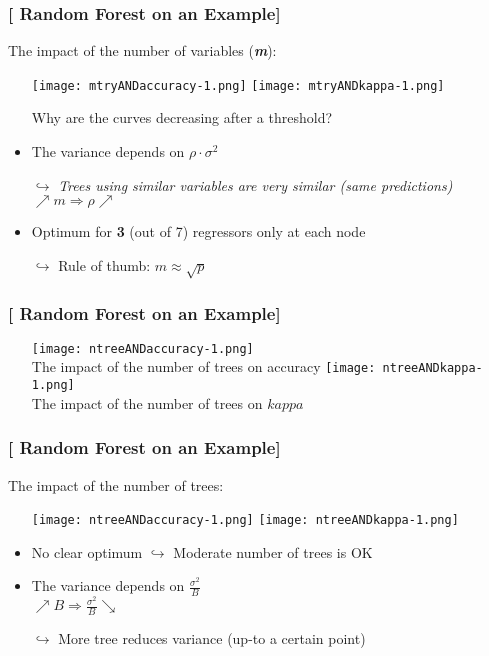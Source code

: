 \documentclass[xcolor=x11names,compress]{beamer}
\renewcommand{\(}{\begin{columns}}
\renewcommand{\)}{\end{columns}}
\newcommand{\<}[1]{\begin{column}{#1}}
\renewcommand{\>}{\end{column}}
\begin{document}
\begin{frame}
\frametitle{\textcolor{brique}{[ Random Forest on an Example]}}
The impact of the number of variables (\textbf{\textit{m}}):
\pause
\begin{itemize}[<+->]
    \item[] \texttt{[image: mtryANDaccuracy-1.png]} \texttt{[image: mtryANDkappa-1.png]}
    \item[] Why are the curves decreasing after a threshold?
    \item The variance depends on $\rho \cdot \sigma^{2}$
    \item[$\hookrightarrow$] \textit{Trees using similar variables are very similar (same predictions)} \\
    $\nearrow  m \Longrightarrow \rho \nearrow$\\
    \item Optimum for \textbf{3} (out of 7) regressors only at each node
   \item[$\hookrightarrow$] Rule of thumb: $m \approx \sqrt{p}$
\end{itemize}
\end{frame}



\begin{frame}
\frametitle{\textcolor{brique}{[ Random Forest on an Example]}}
\pause
\begin{itemize}
\item[]
    {\texttt{[image: ntreeANDaccuracy-1.png]}\\  }
    {The impact of the number of trees on accuracy}
    {\texttt{[image: ntreeANDkappa-1.png]}\\ }
    {The impact of the number of trees on $kappa$ }
\end{itemize}
\end{frame}


\begin{frame}
\frametitle{\textcolor{brique}{[ Random Forest on an Example]}}
The impact of the number of trees:
\pause
\begin{itemize}[<+->]
    \item[] \texttt{[image: ntreeANDaccuracy-1.png]} \texttt{[image: ntreeANDkappa-1.png]}
    \item No clear optimum $\hookrightarrow$ Moderate number of trees is OK
    \item The variance depends on $\frac{\sigma^{2}}{B}$ \\
    $\nearrow  B \Longrightarrow \frac{\sigma^{2}}{B}  \searrow $\\
   \item[$\hookrightarrow$] More tree reduces variance (up-to a certain point)
\end{itemize}
\end{frame}
\end{document}
